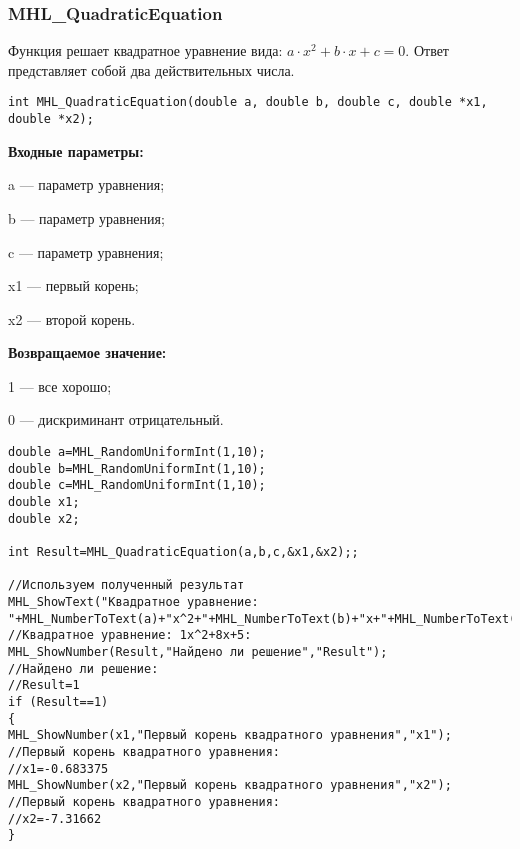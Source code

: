 \documentclass[a4paper,12pt]{article}
\begin{document}
\subsubsection{MHL\_QuadraticEquation}\label{MHL_QuadraticEquation}

Функция решает квадратное уравнение вида: $a\cdot x^2+b\cdot x+c=0$. Ответ представляет собой два действительных числа.


\begin{lstlisting}[label=code_syntax_MHL_QuadraticEquation,caption=Синтаксис]
int MHL_QuadraticEquation(double a, double b, double c, double *x1, double *x2);
\end{lstlisting}

\textbf{Входные параметры:}
 
a --- параметр уравнения;
 
b --- параметр уравнения;
 
c --- параметр уравнения;
 
x1 --- первый корень;
 
x2 --- второй корень.

\textbf{Возвращаемое значение:}
 
1 --- все хорошо;
 
0 --- дискриминант отрицательный.



\begin{lstlisting}[label=code_use_MHL_QuadraticEquation,caption=Пример использования]
double a=MHL_RandomUniformInt(1,10);
double b=MHL_RandomUniformInt(1,10);
double c=MHL_RandomUniformInt(1,10);
double x1;
double x2;

int Result=MHL_QuadraticEquation(a,b,c,&x1,&x2);;

//Используем полученный результат
MHL_ShowText("Квадратное уравнение: "+MHL_NumberToText(a)+"x^2+"+MHL_NumberToText(b)+"x+"+MHL_NumberToText(c)+"=0");
//Квадратное уравнение: 1x^2+8x+5:
MHL_ShowNumber(Result,"Найдено ли решение","Result");
//Найдено ли решение:
//Result=1
if (Result==1)
{
MHL_ShowNumber(x1,"Первый корень квадратного уравнения","x1");
//Первый корень квадратного уравнения:
//x1=-0.683375
MHL_ShowNumber(x2,"Первый корень квадратного уравнения","x2");
//Первый корень квадратного уравнения:
//x2=-7.31662
}
\end{lstlisting}

\newpage
\end{document}
